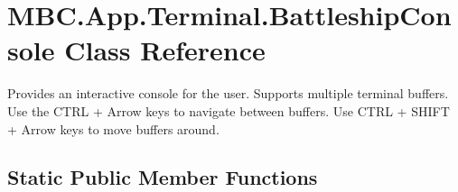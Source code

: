 \hypertarget{class_m_b_c_1_1_app_1_1_terminal_1_1_battleship_console}{\section{M\-B\-C.\-App.\-Terminal.\-Battleship\-Console Class Reference}
\label{class_m_b_c_1_1_app_1_1_terminal_1_1_battleship_console}
}


Provides an interactive console for the user. Supports multiple terminal buffers. Use the C\-T\-R\-L + Arrow keys to navigate between buffers. Use C\-T\-R\-L + S\-H\-I\-F\-T + Arrow keys to move buffers around.  


\subsection*{Static Public Member Functions}
